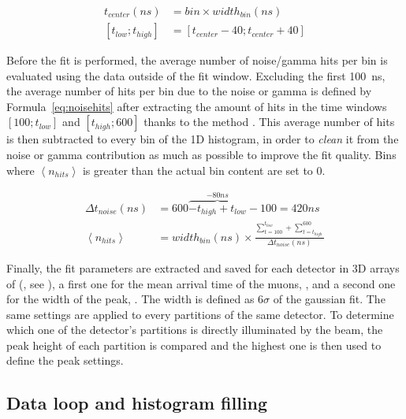 	\begin{subequations}
	\label{eq:fitwindow}
	\begin{align}
		t_{center}(ns) & = bin \times width_{bin}(ns)\\
		[t_{low};t_{high}] & = [t_{center} - 40; t_{center} + 40]
	\end{align}
	\end{subequations}
	
	Before the fit is performed, the average number of noise/gamma hits per bin is evaluated using the data outside of the fit window. Excluding the first \SI{100}{ns}, the average number of hits per bin due to the noise or gamma is defined by Formula~\ref{eq:noisehits} after extracting the amount of hits in the time windows $[100;t_{low}]$ and $[t_{high};600]$ thanks to the method . This average number of hits is then subtracted to every bin of the 1D histogram, in order to \textit{clean} it from the noise or gamma contribution as much as possible to improve the fit quality. Bins where $\left\langle n_{hits} \right\rangle$ is greater than the actual bin content are set to 0.
	
	\begin{subequations}
	\label{eq:noisehits}
	\begin{align}
		\Delta t_{noise}(ns) & = 600 \overbrace{- t_{high} + t_{low}}^{-80ns} - 100 = 420ns \\
		\left\langle n_{hits} \right\rangle & = width_{bin}(ns) \times \frac{\sum_{t=100}^{t_{low}}+\sum_{t=t_{high}}^{600}}{\Delta t_{noise}(ns)}
	\end{align}
	\end{subequations}
	
	Finally, the fit parameters are extracted and saved for each detector in 3D arrays of  (, see ), a first one for the mean arrival time of the muons, , and a second one for the width of the peak, . The width is defined as 6$\sigma$ of the gaussian fit. The same settings are applied to every partitions of the same detector. To determine which one of the detector's partitions is directly illuminated by the beam, the peak height of each partition is compared and the highest one is then used to define the peak settings.
	
	\subsection{Data loop and histogram filling}
	\label{app2:ssec:dataloop}
	
